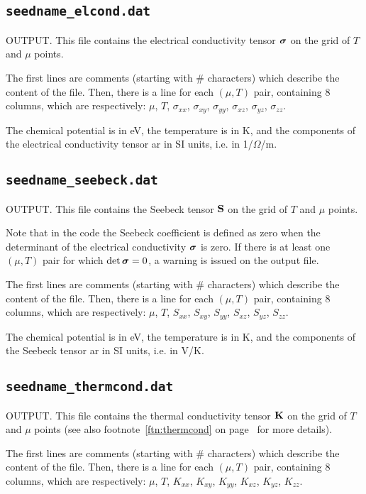 \subsection{{\tt seedname\_elcond.dat}}
OUTPUT. This file contains the electrical conductivity tensor $\bm{\mathrm{\sigma}}$ on the grid of $T$ and $\mu$ points. 

The first lines are comments (starting with \# characters) which describe the content of the file.
Then, there is a line for each $(\mu,T)$ pair, containing 8 columns, which are respectively: $\mu$, $T$, $\sigma_{xx}$, $\sigma_{xy}$, $\sigma_{yy}$, $\sigma_{xz}$, $\sigma_{yz}$, $\sigma_{zz}$.

The chemical potential is in eV, the temperature is in K, and the components of the electrical conductivity tensor ar in SI units, i.e. in 1/$\Omega$/m.
\subsection{{\tt seedname\_seebeck.dat}}
OUTPUT. This file contains the Seebeck tensor $\bm{\mathrm{S}}$ on the grid of $T$ and $\mu$ points. 

Note that in the code the Seebeck coefficient is defined as zero when the determinant of the electrical conductivity $\bm{\mathrm{\sigma}}$ is zero. If there is at least one $(\mu, T)$ pair for which $\det \bm{\mathrm{\sigma}}=0$, a warning is issued on the output file.

The first lines are comments (starting with \# characters) which describe the content of the file.
Then, there is a line for each $(\mu,T)$ pair, containing 8 columns, which are respectively: $\mu$, $T$, $S_{xx}$, $S_{xy}$, $S_{yy}$, $S_{xz}$, $S_{yz}$, $S_{zz}$.

The chemical potential is in eV, the temperature is in K, and the components of the Seebeck tensor ar in SI units, i.e. in V/K.

\subsection{{\tt seedname\_thermcond.dat}}
OUTPUT. This file contains the thermal conductivity tensor $\bm{\mathrm{K}}$ on the grid of $T$ and $\mu$ points (see also footnote~\ref{ftn:thermcond} on page~\pageref{ftn:thermcond} for more details).

The first lines are comments (starting with \# characters) which describe the content of the file.
Then, there is a line for each $(\mu,T)$ pair, containing 8 columns, which are respectively: $\mu$, $T$, $K_{xx}$, $K_{xy}$, $K_{yy}$, $K_{xz}$, $K_{yz}$, $K_{zz}$.

